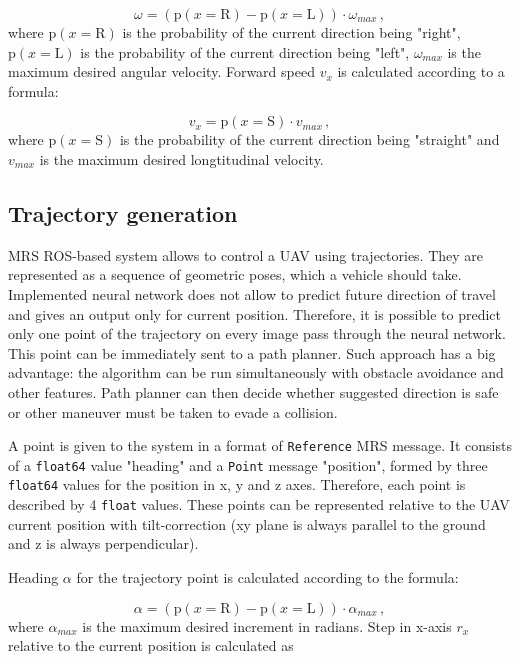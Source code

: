 \begin{equation}
	\omega = (\textrm{p}(x = \textrm{R}) - \textrm{p}(x = \textrm{L}))\cdot\omega_{max}\,,
\end{equation}
where $\textrm{p}(x = \textrm{R})$ is the probability of the current direction being "right", $\textrm{p}(x = \textrm{L})$ is the probability of the current direction being "left", $\omega_{max}$ is the maximum desired angular velocity. Forward speed $v_x$ is calculated according to a formula:

\begin{equation}
	v_x = \textrm{p}(x = \textrm{S})\cdot v_{max}\,,
\end{equation}
where $\textrm{p}(x = \textrm{S})$ is the probability of the current direction being "straight" and $v_{max}$ is the maximum desired longtitudinal velocity.


\subsection{Trajectory generation}

\acs{MRS} \acs{ROS}-based system allows to control a \acs{UAV} using trajectories. They are represented as a sequence of geometric poses, which a vehicle should take. Implemented neural network does not allow to predict future direction of travel and gives an output only for current position. Therefore, it is possible to predict only one point of the trajectory on every image pass through the neural network. This point can be immediately sent to a path planner. Such approach has a big advantage: the algorithm can be run simultaneously with obstacle avoidance and other features. Path planner can then decide whether suggested direction is safe or other maneuver must be taken to evade a collision.

A point is given to the system in a format of \texttt{Reference} \acs{MRS} message. It consists of a \texttt{float64} value "heading" and a \texttt{Point} message "position", formed by three \texttt{float64} values for the position in x, y and z axes. Therefore, each point is described by 4 \texttt{float} values. These points can be represented relative to the \acs{UAV} current position with tilt-correction (xy plane is always parallel to the ground and z is always perpendicular). 

Heading $\alpha$ for the trajectory point is calculated according to the formula:

\begin{equation}
	\alpha = (\textrm{p}(x = \textrm{R}) - \textrm{p}(x = \textrm{L}))\cdot \alpha_{max}\,,
\end{equation}
where $\alpha_{max}$ is the maximum desired increment in radians. Step in x-axis $r_x$ relative to the current position is calculated as

